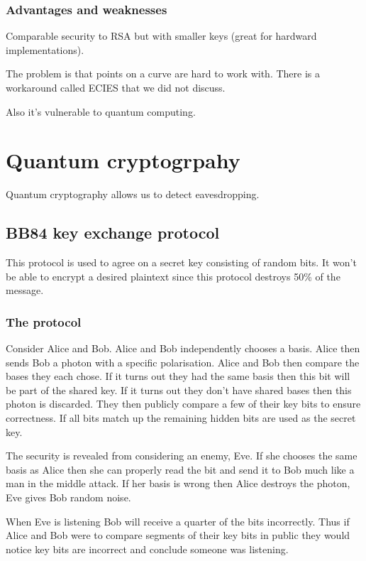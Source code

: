 \documentclass{report}
\begin{document}
\subsection{Advantages and weaknesses}
Comparable security to RSA but with smaller keys (great for hardward
implementations).

The problem is that points on a curve are hard to work with. There is a
workaround called ECIES that we did not discuss.

Also it's vulnerable to quantum computing.

\chapter{Quantum cryptogrpahy}
Quantum cryptography allows us to detect eavesdropping.

\section{BB84 key exchange protocol}
This protocol is used to agree on a secret key consisting of random bits.
It won't be able to encrypt a desired plaintext since this protocol destroys
50\% of the message.

\subsection{The protocol}
Consider Alice and Bob. Alice and Bob independently chooses a basis. Alice then
sends Bob a photon with a specific polarisation.
Alice and Bob then compare the bases they each chose. If it turns out they
had the same basis then this bit will be part of the shared key.
If it turns out they don't have shared bases then this photon is discarded.
They then publicly compare a few of their key bits to ensure correctness.
If all bits match up the remaining hidden bits are used as the secret key.

The security is revealed from considering an enemy, Eve. If she chooses the
same basis as Alice then she can properly read the bit and send it to Bob
much like a man in the middle attack. If her basis is wrong then Alice
destroys the photon, Eve gives Bob random noise.

When Eve is listening Bob will receive a quarter of the bits incorrectly.
Thus if Alice and Bob were to compare segments of their key bits in public
they would notice key bits are incorrect and conclude someone was listening.
\end{document}
